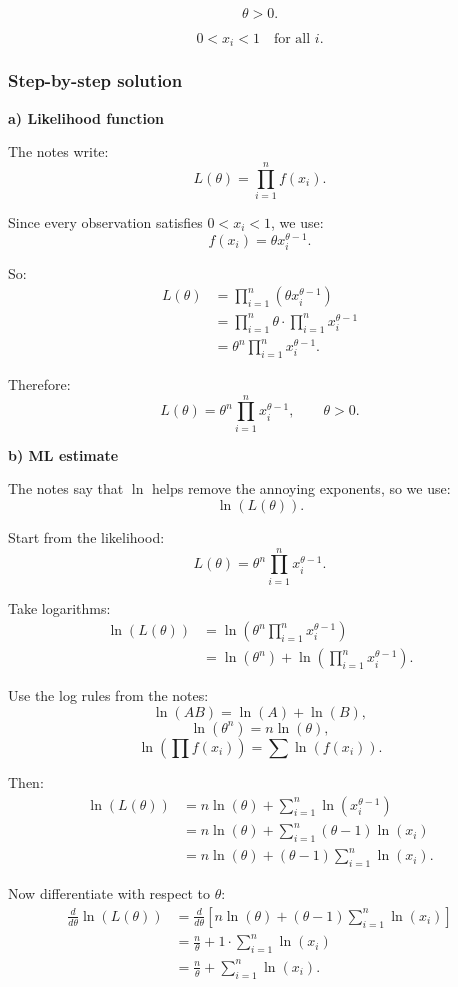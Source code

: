 \documentclass[10pt]{article}
\begin{document}
\[
\theta>0.
\]

\[
0<x_i<1
\quad
\text{for all }i.
\]

\subsubsection*{Step-by-step solution}

\textbf{a) Likelihood function}

The notes write:
\[
L(\theta)
=
\prod_{i=1}^{n} f(x_i).
\]

Since every observation satisfies \(0<x_i<1\),
we use:
\[
f(x_i)=\theta x_i^{\theta-1}.
\]

So:
\begin{align*}
L(\theta)
&=
\prod_{i=1}^{n}
\left(
\theta x_i^{\theta-1}
\right)
\\[2mm]
&=
\prod_{i=1}^{n}\theta
\cdot
\prod_{i=1}^{n}
x_i^{\theta-1}
\\[2mm]
&=
\theta^n
\prod_{i=1}^{n}
x_i^{\theta-1}.
\end{align*}

Therefore:
\[
L(\theta)
=
\theta^n
\prod_{i=1}^{n}
x_i^{\theta-1},
\qquad
\theta>0.
\]

\textbf{b) ML estimate}

The notes say that \(\ln\) helps remove the annoying
exponents, so we use:
\[
\ln(L(\theta)).
\]

Start from the likelihood:
\[
L(\theta)
=
\theta^n
\prod_{i=1}^{n}
x_i^{\theta-1}.
\]

Take logarithms:
\begin{align*}
\ln(L(\theta))
&=
\ln\left(
\theta^n
\prod_{i=1}^{n}
x_i^{\theta-1}
\right)
\\[2mm]
&=
\ln(\theta^n)
+
\ln\left(
\prod_{i=1}^{n}
x_i^{\theta-1}
\right).
\end{align*}

Use the log rules from the notes:
\[
\ln(AB)=\ln(A)+\ln(B),
\]
\[
\ln(\theta^n)=n\ln(\theta),
\]
\[
\ln\left(\prod f(x_i)\right)
=
\sum \ln(f(x_i)).
\]

Then:
\begin{align*}
\ln(L(\theta))
&=
n\ln(\theta)
+
\sum_{i=1}^{n}
\ln\left(
x_i^{\theta-1}
\right)
\\[2mm]
&=
n\ln(\theta)
+
\sum_{i=1}^{n}
(\theta-1)\ln(x_i)
\\[2mm]
&=
n\ln(\theta)
+
(\theta-1)
\sum_{i=1}^{n}
\ln(x_i).
\end{align*}

Now differentiate with respect to \(\theta\):
\begin{align*}
\frac{d}{d\theta}
\ln(L(\theta))
&=
\frac{d}{d\theta}
\left[
n\ln(\theta)
+
(\theta-1)
\sum_{i=1}^{n}
\ln(x_i)
\right]
\\[2mm]
&=
\frac{n}{\theta}
+
1\cdot
\sum_{i=1}^{n}
\ln(x_i)
\\[2mm]
&=
\frac{n}{\theta}
+
\sum_{i=1}^{n}
\ln(x_i).
\end{align*}
\end{document}
